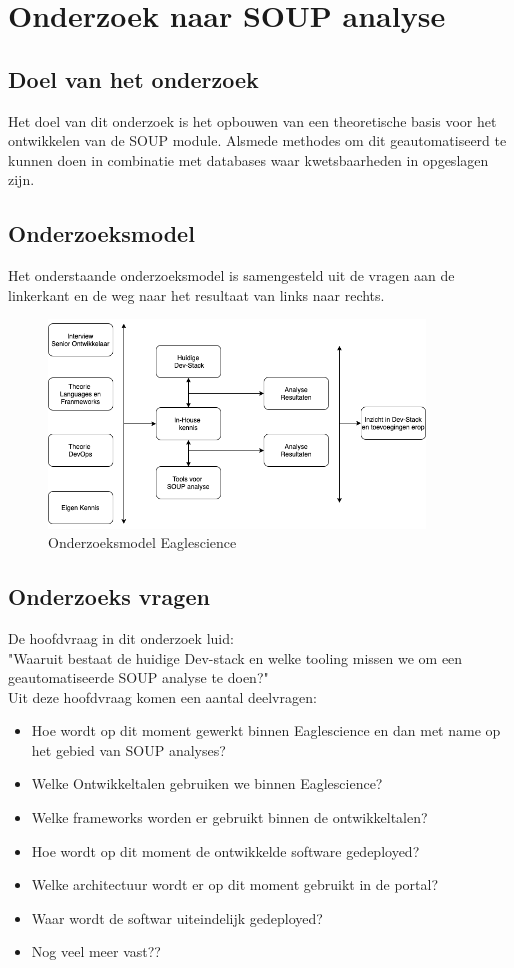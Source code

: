 \section{Onderzoek naar SOUP analyse}
\subsection{Doel van het onderzoek}
Het doel van dit onderzoek is het opbouwen van een theoretische basis voor het ontwikkelen van de SOUP module. Alsmede methodes om dit geautomatiseerd te kunnen doen in combinatie met databases waar kwetsbaarheden in opgeslagen zijn.


\subsection{Onderzoeksmodel}
Het onderstaande onderzoeksmodel is samengesteld uit de vragen aan de linkerkant en de weg naar het resultaat van links naar rechts.\\
\begin{figure}[h!]
\myfloatalign
\includegraphics[width=10cm]{gfx/OnderzoeksmodelES}
\caption{Onderzoeksmodel Eaglescience}
\label{fig:Onderzoeks model Dev-Stack}
\end{figure}

\subsection{Onderzoeks vragen}
De hoofdvraag in dit onderzoek luid: \\
"Waaruit bestaat de huidige Dev-stack en welke tooling missen we om een geautomatiseerde SOUP analyse te doen?"\\
Uit deze hoofdvraag komen een aantal deelvragen:

\begin{itemize}
  \item Hoe wordt op dit moment gewerkt binnen Eaglescience en dan met name op het gebied van SOUP analyses?
  \item Welke Ontwikkeltalen gebruiken we binnen Eaglescience?
  \item Welke frameworks worden er gebruikt binnen de ontwikkeltalen?
  \item Hoe wordt op dit moment de ontwikkelde software gedeployed?
  \item Welke architectuur wordt er op dit moment gebruikt in de portal?
  \item Waar wordt de softwar uiteindelijk gedeployed?
  \item Nog veel meer vast??
\end{itemize}

